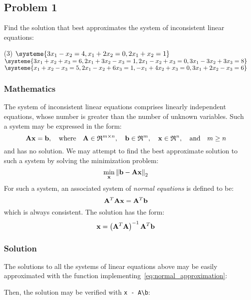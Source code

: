 \subsection{Problem 1}%
\label{sec:problem_1}
Find the solution that best approximates the system of inconsistent linear equations:
\begin{tasks}(3)
  \task $\systeme{3x_1-x_2=4,x_1+2x_2=0,2x_1+x_2=1}$
  \task $\systeme{3x_1+x_2+x_3=6,
  2x_1+3x_2-x_3=1,
  2x_1-x_2+x_3=0,
  3x_1-3x_2+3x_3=8}$
  \task $\systeme{x_1+x_2-x_3=5,
  2x_1-x_2+6x_3=1,
  -x_1+4x_2+x_3=0,
  3x_1+2x_2-x_3=6}$
\end{tasks}
\subsubsection*{Mathematics}
The system of inconsistent linear equations comprises linearly independent equations,
whose number is greater than the number of unknown variables.
Such a system may be expressed in the form:
\begin{equation*}
  \mathbf{Ax}=\mathbf{b}, \quad \text{where} \quad
  \mathbf{A}\in\mathfrak{R}^{m\times{}n}, \quad
  \mathbf{b}\in\mathfrak{R}^m, \quad
  \mathbf{x}\in\mathfrak{R}^n, \quad \text{and} \quad m\geq{}n
\end{equation*}
and has no solution. We may attempt to find the best approximate solution to such a
system by solving the minimization problem:
\begin{equation*}
  \min_{\mathbf{x}}{\left\lVert\mathbf{b}-\mathbf{A}\mathbf{x}\right\rVert}_2
\end{equation*}
For such a system, an associated system of \textit{normal equations} is defined to be:
\begin{equation}
  \mathbf{A}^T\mathbf{Ax}=\mathbf{A}^T\mathbf{b}
\end{equation}
which is always consistent.
The solution has the form:
\begin{equation}
  \label{eq:normal_approximation}
  \mathbf{x}=\left(\mathbf{A}^T\mathbf{A}\right)^{-1}\mathbf{A}^T\mathbf{b}
\end{equation}
\subsubsection*{Solution}
The solutions to all the systems of linear equations above may be easily approximated
with the \MATLAB{} function implementing~\eqref{eq:normal_approximation}:

Then, the solution may be verified with \lstinline[style=Matlab-editor]{x - A\b}:

